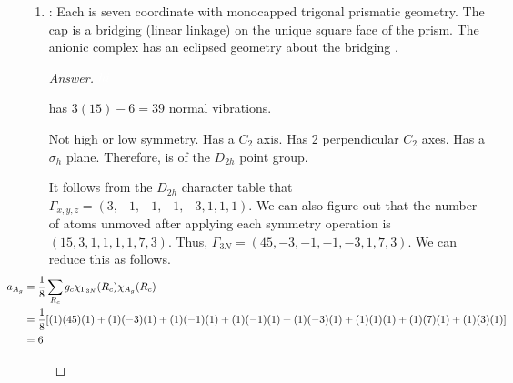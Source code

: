 \documentclass[../psets.tex]{subfiles}
\begin{document}
\begin{enumerate}[label={\Roman*)}]
\begin{enumerate}[label={\alph*)}]
\begin{proof}[Answer]
            Since $\Gamma_\text{trans}=A_1+E$ and $\Gamma_\text{rot}=A_2+E$ (again from the $C_{3v}$ character table), we have by subtraction that
            \begin{equation*}
                \boxed{\Gamma_\text{vibs} = 5A_1+A_2+6E}
            \end{equation*}
            Thus, of the 18 normal vibrations, 5 have symmetry $A_1$, 1 has symmetry $A_2$, and 12 have symmetry $E$ (note that these 12 modes pair up into 6 pairs of vibration modes of the same type).
        \end{proof}
        \item {}: Each  is seven coordinate with monocapped trigonal prismatic geometry. The cap is a bridging  (linear  linkage) on the unique square face of the prism. The anionic complex has an eclipsed geometry about the bridging .
        \begin{proof}[Answer]
            ${\color{white}hi}$
            \begin{center}
                \footnotesize
            \end{center}
             has $3(15)-6=39$ normal vibrations.\par
            Not high or low symmetry. Has a $C_2$ axis. Has 2 perpendicular $C_2$ axes. Has a $\sigma_h$ plane. Therefore,  is of the $D_{2h}$ point group.\par
            It follows from the $D_{2h}$ character table that $\Gamma_{x,y,z}=(3,-1,-1,-1,-3,1,1,1)$. We can also figure out that the number of atoms unmoved after applying each symmetry operation is $(15,3,1,1,1,1,7,3)$. Thus, $\Gamma_{3N}=(45,-3,-1,-1,-3,1,7,3)$. We can reduce this as follows.
            \begin{align*}
                \hspace{-4em}a_{A_g}    &= \frac{1}{8}\sum_{R_c}g_c\chi_{\Gamma_{3N}}(R_c)\chi_{A_g}(R_c)\\
                \hspace{-4em}&= \frac{1}{8}[(1)(45)(1)+(1)(-3)(1)+(1)(-1)(1)+(1)(-1)(1)+(1)(-3)(1)+(1)(1)(1)+(1)(7)(1)+(1)(3)(1)]\\
                \hspace{-4em}&= 6
            \end{align*}
            \begin{align*}

\end{align*}
\end{proof}
\end{enumerate}
\end{enumerate}
\end{document}
